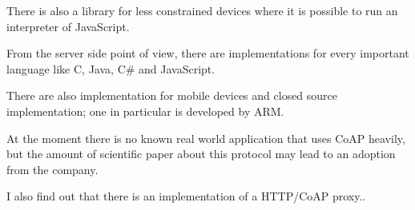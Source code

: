 	There is also a library for less constrained devices where it is possible to run an interpreter of JavaScript.\newline
	
	From the server side point of view, there are implementations for every important language like C, Java, C\# and JavaScript.\newline
	
	There are also implementation for mobile devices and closed source implementation; one in particular is developed by ARM.\newline
	
	At the moment there is no known real world application that uses CoAP heavily, but the amount of scientific paper about this protocol may lead to an adoption from the company.
	\newline
	
	I also find out that there is an implementation of a HTTP/CoAP proxy.\cite{rossini2012design}.